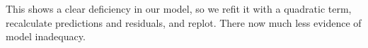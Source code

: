 % 
% 


This shows a clear deficiency in our model, so we refit it with a quadratic term, recalculate predictions and residuals, and replot.  There now much less evidence of model inadequacy.

% 
% 




